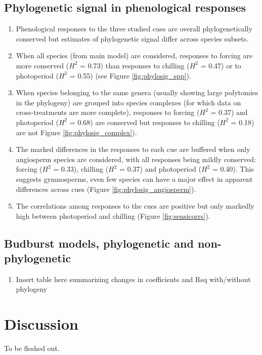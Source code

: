\documentclass{article}\usepackage[]{graphicx}\usepackage[]{color}
\begin{document}
\subsection*{Phylogenetic signal in phenological responses}
\begin{enumerate}
\item Phenological responses to the three studied cues are overall phylogenetically conserved but estimates of phylogenetic signal differ across species subsets.
\item When all species (from main model) are considered, responses to forcing are more conserved ($H^{2}$ = 0.73) than responses to chilling ($H^{2}$ = 0.47) or to photoperiod ($H^{2}$ = 0.55) (see Figure \ref{fig:phylosig_spp}).  
\item When species belonging to the same genera (usually showing large polytomies in the phylogeny) are grouped into species complexes (for which data on cross-treatments are more complete), responses to forcing ($H^{2}$ = 0.37) and photoperiod ($H^{2}$ = 0.68) are conserved but responses to chilling ($H^{2}$ = 0.18) are not Figure \ref{fig:phylosig_complex}).  
\item The marked differences in the responses to each cue are buffered when only angiosperm species are considered, with all responses being mildly conserved: forcing ($H^{2}$ = 0.33), chilling ($H^{2}$ = 0.37) and photoperiod ($H^{2}$ = 0.40). This suggests gymnosperms, even few species can have a major  effect in apparent differences across cues (Figure \ref{fig:phylosig_angiosperm}). 
\item The correlations among responses to the cues are positive but only markedly high between photoperiod and chilling (Figure \ref{fig:sensicorrs}).

\end{enumerate}


\subsection*{Budburst models, phylogenetic and non-phylogenetic}
\begin{enumerate}
\item Insert table here summarizing changes in coefficients and Rsq with/without phylogeny
\end{enumerate}




\section*{Discussion}
To be fleshed out.
\end{document}
